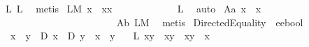 \begin{isabellebody}
%
\isatagproof
{}\isamarkupfalse%
\ L{}{}\ L{}{}\ \isamarkupfalse%
\ metis%
\endisatagproof
{\isafoldproof}%
%
\isadelimproof
%
\endisadelimproof
\isanewline
{}\isamarkupfalse%
\ LM{}{}{\isacharcolon}\ {\isachardoublequoteopen}{\isacharparenleft}{\isasymbox}x{\isacharparenright}{\isasymbox}\ {\isasymapprox}\ {\isacharparenleft}{\isasymbox}x{\isacharparenright}{\isasymcdot}{\isacharparenleft}{\isacharparenleft}{\isasymbox}x{\isacharparenright}{\isasymbox}{\isacharparenright}{\isachardoublequoteclose}%
\isadelimproof
\ \ \ \ \ \ \ \ \ \ \ %
\endisadelimproof
%
\isatagproof
{}\isamarkupfalse%
\ L{}{}\ \isamarkupfalse%
\ auto%
\endisatagproof
{\isafoldproof}%
%
\isadelimproof
%
\endisadelimproof
\isanewline
{}\isamarkupfalse%
\ A{}a{\isacharcolon}\ {\isachardoublequoteopen}{\isacharparenleft}{\isasymbox}x{\isacharparenright}{\isasymbox}\ {\isasymapprox}\ {\isasymbox}x{\isachardoublequoteclose}%
\isadelimproof
\ \ \ \ \ \ \ \ \ \ \ \ \ \ \ \ \ \ \ \ \ \ %
\endisadelimproof
%
\isatagproof
{}\isamarkupfalse%
\ A{}b\ LM{}{}\ \isamarkupfalse%
\ metis%
\endisatagproof
{\isafoldproof}%
%
\isadelimproof
%
\endisadelimproof
\isanewline
\isanewline
\isanewline
{}\isamarkupfalse%
\ DirectedEquality\ {\isacharcolon}{\isacharcolon}\ {\isachardoublequoteopen}e{\isasymRightarrow}e{\isasymRightarrow}bool{\isachardoublequoteclose}\ {\isacharparenleft}\ {\isachardoublequoteopen}{\isasymgreaterapprox}{\isachardoublequoteclose}\ {}{}{\isacharparenright}\ \isanewline
\ \ {\isachardoublequoteopen}x\ {\isasymgreaterapprox}\ y\ {\isasymequiv}\ {\isacharparenleft}{\isacharparenleft}D\ x{\isacharparenright}\ \isactrlbold {\isasymrightarrow}\ {\isacharparenleft}D\ y{\isacharparenright}{\isacharparenright}\ \isactrlbold {\isasymand}\ x\ \isactrlbold {\isacharequal}\ y{\isachardoublequoteclose}\ \ \isanewline
\isanewline
{}\isamarkupfalse%
\ L{}{\isacharunderscore}{}{}{\isacharcolon}\ {\isachardoublequoteopen}{\isacharparenleft}{\isacharparenleft}{\isasymbox}{\isacharparenleft}x{\isasymcdot}y{\isacharparenright}{\isacharparenright}\ {\isasymapprox}\ {\isacharparenleft}{\isasymbox}{\isacharparenleft}x{\isasymcdot}{\isacharparenleft}{\isasymbox}y{\isacharparenright}{\isacharparenright}{\isacharparenright}{\isacharparenright}\ \isactrlbold {\isasymleftrightarrow}\ {\isacharparenleft}{\isacharparenleft}{\isasymbox}{\isacharparenleft}x{\isasymcdot}y{\isacharparenright}{\isacharparenright}\ {\isasymgreaterapprox}\ {\isasymbox}x{\isacharparenright}{\isachardoublequoteclose}\ \isanewline

\end{isabellebody}
